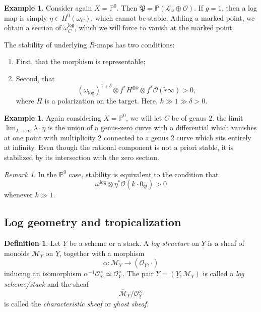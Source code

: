 \documentclass[10pt]{amsart}
\theoremstyle{definition}
\newtheorem{defn}[thm]{Definition}
\newtheorem{exm}[thm]{Example}
\theoremstyle{remark}
\newtheorem{rmk}[thm]{Remark}
\theoremstyle{plain}
\theoremstyle{definition}
\theoremstyle{remark}
\renewcommand{\P}{\mathbb{P}}
\newcommand{\mc}[1]{\mathcal{#1}}
\newcommand{\mf}[1]{\mathfrak{#1}}
\newcommand{\ol}[1]{\overline{#1}}
\newcommand{\ul}[1]{\underline{#1}}
\newcommand{\1}{\mathbf{1}}
\newcommand{\2}{\mathbf{2}}
\newcommand{\3}{\mathbf{3}}
\begin{document}
\begin{exm}
    Consider again $X = \P^0$. Then $\mf{P} = \P(\mc{L}_{\omega} \oplus \mc{O})$. If $g=1$, then a log map is simply $\eta \in H^0(\omega_C)$, which cannot be stable. Adding a marked point, we obtain a section of $\omega_C^{\log}$, which we will force to vanish at the marked point.
\end{exm}

The stability of underlying $R$-maps has two conditions:
\begin{enumerate}
    \item First, that the morphism is representable;
    \item Second, that
        \[ (\omega_{\log})^{1+\delta} \otimes f^* H^{\otimes k} \otimes f^* \mc{O}(\tilde{r}\infty) > 0, \]
        where $H$ is a polarization on the target. Here, $k \gg 1 \gg \delta > 0$.
\end{enumerate}

\begin{exm}
    Again considering $X = \P^0$, we will let $C$ be of genus $2$. the limit $\lim_{\lambda \to \infty} \lambda \cdot \eta$ is the union of a genus-zero curve with a differential which vanishes at one point with multiplicity $2$ connected to a genus $2$ curve which sits entirely at infinity. Even though the rational component is not a priori stable, it is stabilized by its intersection with the zero section.
\end{exm}

\begin{rmk}
    In the $\P^0$ case, stability is equivalent to the condition that
    \[ \omega^{\log} \otimes \eta^* \mc{O}(k \cdot 0_{\mf{P}}) > 0 \]
    whenever $k \gg 1$.
\end{rmk}

\subsection{Log geometry and tropicalization}%
\label{sub:Log geometry and tropicalization}


\begin{defn}
    Let $\ul{Y}$ be a scheme or a stack. A \textit{log structure} on $\ul{Y}$ is a sheaf of monoids $\mc{M}_Y$ on $\ul{Y}$, together with a morphism
    \[ \alpha \colon \mc{M}_Y \to (\mc{O}_{\ul{Y}}, \cdot) \]
    inducing an isomorphism $\alpha^{-1} \mc{O}_{\ul{Y}}^{\times} \simeq \mc{O}_{\ul{Y}}^{\times}$. The pair $Y = (\ul{Y}, \mc{M}_Y)$ is called a \textit{log scheme/stack} and the sheaf
    \[ \ol{\mc{M}}_{Y}/\mc{O}_{\ul{Y}}^{\times} \]
    is called the \textit{characteristic sheaf} or \textit{ghost sheaf}.
\end{defn}
\end{document}

